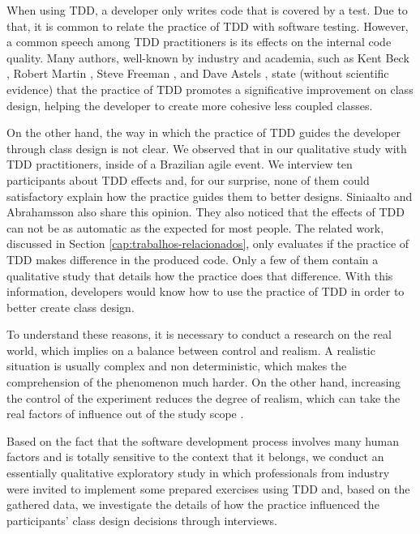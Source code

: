 \documentclass[conference]{IEEEtran}
\begin{document}
When using TDD, a developer only writes code that is covered by a test. Due
to that, it is common to relate the practice of TDD with software testing. However,
a common speech among TDD practitioners is its effects on the internal code quality.
Many authors, well-known by industry and academia, such as Kent Beck \cite{TDDByExample}, 
Robert Martin \cite{agile-ppp}, Steve Freeman \cite{GOOS}, and Dave Astels \cite{astels-tdd}, 
state (without scientific evidence) that the practice of TDD promotes a significative
improvement on class design, helping the developer to create more cohesive less coupled
classes.

On the other hand, the way in which the practice of TDD guides the developer
through class design is not clear. We observed that in our qualitative study
with TDD practitioners, inside of a Brazilian agile event. We interview
ten participants about TDD effects \cite{aniche-wbma} and, for our surprise,
none of them could satisfactory explain how the practice guides them to better
designs.
Siniaalto and Abrahamsson \cite{alarming-results} also share this opinion. They also
noticed that the effects of TDD can not be as automatic as the expected for most people.
The related work, discussed in Section \ref{cap:trabalhos-relacionados},
only evaluates if the practice of TDD makes difference in the produced code. Only a few
of them contain a qualitative study that details how the practice does that difference.
With this information, developers would know how to use the practice of TDD in order to 
better create class design.

To understand these reasons, it is necessary to conduct a research on the real world, which
implies on a balance between control and realism. A realistic situation is usually
complex and non deterministic, which makes the comprehension of the phenomenon much
harder. On the other hand, increasing the control of the experiment reduces the
degree of realism, which can take the real factors of influence out of the study
scope \cite{guidelines-case-study}.

Based on the fact that the software development process involves many
human factors and is totally sensitive to the context that it belongs,
we conduct an essentially qualitative exploratory study in which professionals
from industry were invited to implement some prepared exercises using TDD and,
based on the gathered data, we investigate the details of how the practice influenced
the participants' class design decisions through interviews.
\end{document}
